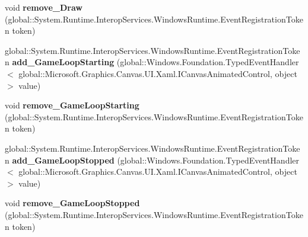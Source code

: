 \begin{DoxyCompactItemize}
\item 
\mbox{\label{interface_microsoft_1_1_graphics_1_1_canvas_1_1_u_i_1_1_xaml_1_1_i_canvas_animated_control_a92b78e42e9c4487aa3aceec75cb19108}} 
void {\bfseries remove\+\_\+\+Draw} (global\+::\+System.\+Runtime.\+Interop\+Services.\+Windows\+Runtime.\+Event\+Registration\+Token token)
\item 
\mbox{\label{interface_microsoft_1_1_graphics_1_1_canvas_1_1_u_i_1_1_xaml_1_1_i_canvas_animated_control_ace3201e05768ec0cb189a06a8287c709}} 
global\+::\+System.\+Runtime.\+Interop\+Services.\+Windows\+Runtime.\+Event\+Registration\+Token {\bfseries add\+\_\+\+Game\+Loop\+Starting} (global\+::\+Windows.\+Foundation.\+Typed\+Event\+Handler$<$ global\+::\+Microsoft.\+Graphics.\+Canvas.\+U\+I.\+Xaml.\+I\+Canvas\+Animated\+Control, object $>$ value)
\item 
\mbox{\label{interface_microsoft_1_1_graphics_1_1_canvas_1_1_u_i_1_1_xaml_1_1_i_canvas_animated_control_ae7d786b9e08eabd196fd8d0dcd993a9b}} 
void {\bfseries remove\+\_\+\+Game\+Loop\+Starting} (global\+::\+System.\+Runtime.\+Interop\+Services.\+Windows\+Runtime.\+Event\+Registration\+Token token)
\item 
\mbox{\label{interface_microsoft_1_1_graphics_1_1_canvas_1_1_u_i_1_1_xaml_1_1_i_canvas_animated_control_a47c0db742873551ad530322dc7d89abe}} 
global\+::\+System.\+Runtime.\+Interop\+Services.\+Windows\+Runtime.\+Event\+Registration\+Token {\bfseries add\+\_\+\+Game\+Loop\+Stopped} (global\+::\+Windows.\+Foundation.\+Typed\+Event\+Handler$<$ global\+::\+Microsoft.\+Graphics.\+Canvas.\+U\+I.\+Xaml.\+I\+Canvas\+Animated\+Control, object $>$ value)
\item 
\mbox{\label{interface_microsoft_1_1_graphics_1_1_canvas_1_1_u_i_1_1_xaml_1_1_i_canvas_animated_control_a712a4a579c4ee72d0f88076a7972ed96}} 
void {\bfseries remove\+\_\+\+Game\+Loop\+Stopped} (global\+::\+System.\+Runtime.\+Interop\+Services.\+Windows\+Runtime.\+Event\+Registration\+Token token)

\end{DoxyCompactItemize}
